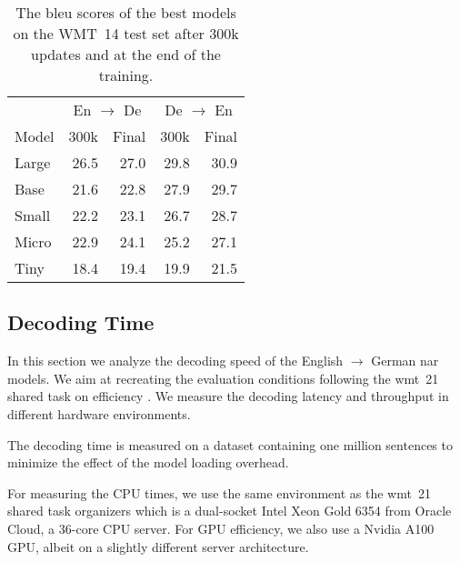 



\begin{table}
  \centering

  \begin{tabular}{lrrrr}
    \toprule
    & \multicolumn{2}{c}{En $\rightarrow$ De}
    & \multicolumn{2}{c}{De $\rightarrow$ En} \\
    Model
    & 300k & Final & 300k & Final \\
    \midrule

    Large & 26.5 & 27.0 & 29.8 & 30.9 \\
    Base & 21.6 & 22.8 & 27.9 & 29.7 \\
    Small & 22.2 & 23.1 & 26.7 & 28.7 \\
    Micro & 22.9 & 24.1 & 25.2 & 27.1 \\
    Tiny & 18.4 & 19.4 & 19.9 & 21.5 \\
    \bottomrule
  \end{tabular}

  \caption{The \acs{bleu} scores of the best models on the WMT~14 test set
    after 300k updates and at the end of the training. }
  \label{tab:wmt14-bleu-scores}
\end{table}

\subsection{Decoding Time}%
\label{subsec:results:time}

In this section we analyze the decoding speed of the English $\rightarrow$
German \ac{nar} models. We aim at recreating the evaluation conditions
following the \acs{wmt}~21 shared task on efficiency
\citep{heafield-etal-2021-findings}. We measure the decoding latency and
throughput in different hardware environments.

The decoding time is measured on a dataset containing one million sentences to
minimize the effect of the model loading overhead.

For measuring the CPU times, we use the same environment as the \acs{wmt}~21
shared task organizers which is a dual-socket Intel Xeon Gold 6354 from Oracle
Cloud, a 36-core CPU server. For GPU efficiency, we also use a Nvidia A100 GPU,
albeit on a slightly different server architecture. 

